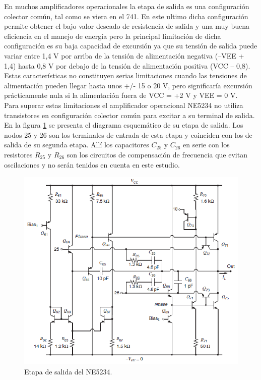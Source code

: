 \documentclass[12pt,a4paper,final,headinclude,footinclude,BCOR5mm]{scrartcl}
\begin{document}
En muchos amplificadores operacionales la etapa de salida es una configuración colector común, tal como se viera en el 741. En este ultimo dicha configuración permite obtener el bajo valor deseado de resistencia de salida y una muy buena eficiencia en el manejo de energía pero la principal limitación de dicha configuración es su baja capacidad de excursión ya que su tensión de salida puede variar entre 1,4 V por arriba de la tensión de alimentación negativa (–VEE + 1,4) hasta 0,8 V por debajo de la tensión de alimentación positiva (VCC – 0,8). Estas características no constituyen serias limitaciones cuando las tensiones de alimentación pueden llegar hasta unos +/- 15 o 20 V, pero significaría excursión prácticamente nula si la alimentación fuera de VCC = +2 V y VEE = 0 V.\\

Para superar estas limitaciones el amplificador operacional NE5234 no utiliza transistores en configuración colector común para excitar a su terminal de salida. En la figura \ref{639} se presenta el diagrama esquemático de su etapa de salida. Los nodos 25 y 26 son los terminales de entrada de esta etapa y coinciden con los de salida de su segunda etapa. Allí los capacitores $C_{25}$ y $C_{26}$ en serie con los resistores $R_{25}$ y $R_{26}$ son los circuitos de compensación de frecuencia que evitan oscilaciones y no serán tenidos en cuenta en este estudio.

\begin{figure}[!h]
\begin{center}
\includegraphics[width=400pt]{./imagenes/salida5234.png}
\end{center}
\caption{Etapa de salida del NE5234.}
\label{639}
\end{figure}
\end{document}
